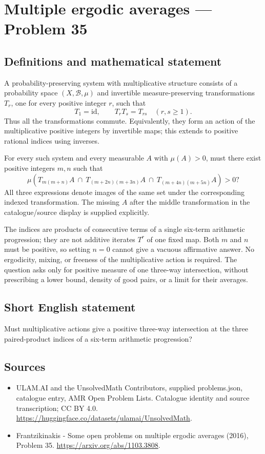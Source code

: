 \documentclass[11pt,a4paper]{article}
\begin{document}
\section*{Multiple ergodic averages — Problem 35}\label{statement}

\subsection{Definitions and mathematical statement}
A probability-preserving system with multiplicative
structure consists of a probability space
$(X,\mathcal B,\mu)$ and invertible
measure-preserving transformations $T_r$, one
for every positive integer $r$, such that
\[
                  T_1=\mathrm{id},\qquad
                  T_rT_s=T_{rs}\quad(r,s\ge1).
\]
Thus all the transformations commute. Equivalently,
they form an action of the multiplicative positive
integers by invertible maps; this extends to
positive rational indices using inverses.

For every such system and every measurable
$A$ with $\mu(A)>0$, must there exist
positive integers $m,n$ such that
\[
 \mu\left(
 T_{m(m+n)}A\ \cap\ T_{(m+2n)(m+3n)}A\ \cap\
 T_{(m+4n)(m+5n)}A
 \right)>0?
\]
All three expressions denote images of the
same set under the corresponding indexed
transformation. The missing $A$ after the
middle transformation in the catalogue/source
display is supplied explicitly.

The indices are products of consecutive terms
of a single six-term arithmetic progression;
they are not additive iterates $T^r$ of
one fixed map. Both $m$ and $n$ must
be positive, so setting $n=0$ cannot give
a vacuous affirmative answer. No ergodicity,
mixing, or freeness of the multiplicative
action is required. The question asks only
for positive measure of one three-way
intersection, without prescribing a lower
bound, density of good pairs, or a limit
for their averages.
\subsection{Short English statement}
Must multiplicative actions give a positive three-way intersection at the three paired-product indices of a six-term arithmetic progression?
\subsection{Sources}
\begin{itemize}
\item[S1] ULAM.AI and the UnsolvedMath Contributors, supplied problems.json, catalogue entry, AMR Open Problem Lists. Catalogue identity and source transcription; CC BY 4.0.
\url{https://huggingface.co/datasets/ulamai/UnsolvedMath}.
\item[S2] Frantzikinakis - Some open problems on multiple ergodic averages (2016), Problem 35. 
\url{https://arxiv.org/abs/1103.3808}.
\end{itemize}
\end{document}
